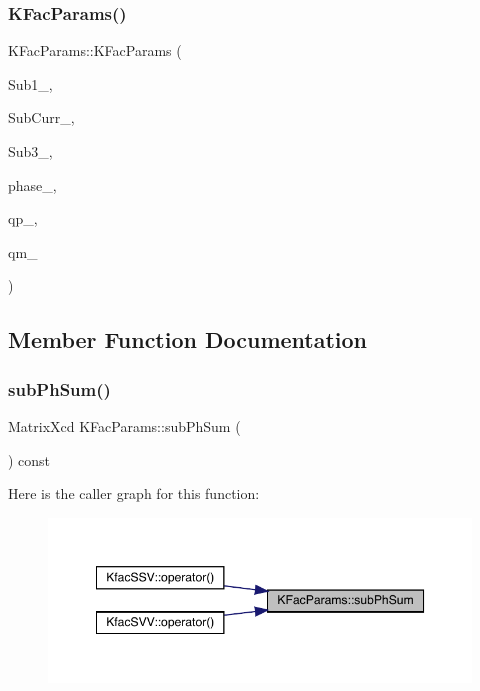 \subsubsection{\texorpdfstring{KFacParams()}{KFacParams()}}
{\footnotesize\ttfamily K\+Fac\+Params\+::\+K\+Fac\+Params (\begin{DoxyParamCaption}\item[{map$<$ int, Eigen\+::\+Matrix\+Xcd $>$}]{Sub1\+\_\+,  }\item[{map$<$ int, Eigen\+::\+Matrix\+Xcd $>$}]{Sub\+Curr\+\_\+,  }\item[{map$<$ int, Eigen\+::\+Matrix\+Xcd $>$}]{Sub3\+\_\+,  }\item[{\mbox{\hyperlink{structPh_1_1phChars}{Ph\+::ph\+Chars}}}]{phase\+\_\+,  }\item[{Vector\+Xd}]{qp\+\_\+,  }\item[{Vector\+Xd}]{qm\+\_\+ }\end{DoxyParamCaption})}



\subsection{Member Function Documentation}
\mbox{\label{classKFacParams_a0f22066b9390b3a28b78d9c679c71f90}} 
\subsubsection{\texorpdfstring{subPhSum()}{subPhSum()}}
{\footnotesize\ttfamily Matrix\+Xcd K\+Fac\+Params\+::sub\+Ph\+Sum (\begin{DoxyParamCaption}{ }\end{DoxyParamCaption}) const\hspace{0.3cm}{\ttfamily [virtual]}}

Here is the caller graph for this function\+:
\nopagebreak
\begin{figure}[H]
\begin{center}
\leavevmode
\includegraphics[width=349pt]{d7/d41/classKFacParams_a0f22066b9390b3a28b78d9c679c71f90_icgraph}
\end{center}
\end{figure}
\mbox{\label{classKFacParams_a023894ddf4ee41134ce512a2bd2a8075}} 
